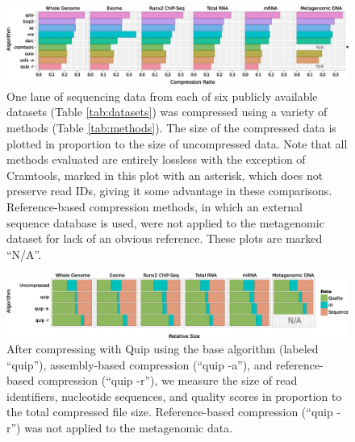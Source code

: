 \documentclass[a4,center,fleqn]{NAR}
\begin{document}
\begin{figure}
\begin{center}
\includegraphics[width=\textwidth]{sizes.eps}
\end{center}
\caption{
One lane of sequencing data from each of six publicly available datasets
(Table \ref{tab:datasets}) was compressed using a variety of methods (Table
\ref{tab:methods}). The size of the compressed data is plotted in proportion
to the size of uncompressed data. Note that all methods evaluated are entirely
lossless with the exception of Cramtools, marked in this plot with an
asterisk, which does not preserve read IDs, giving it some advantage in these
comparisons. Reference-based compression methods, in which an external
sequence database is used, were not applied to the metagenomic dataset for lack of an
obvious reference. These
plots are marked ``N/A''.
}
\label{fig:sizes}
\end{figure}



\begin{figure}
\centerline{\includegraphics[width=\textwidth]{relative_sizes.eps}}
\caption{
After compressing with Quip using the base algorithm (labeled ``quip''),
assembly-based compression (``quip -a''), and reference-based compression
(``quip -r''), we measure the size of read identifiers, nucleotide sequences,
and quality scores in proportion to the total compressed file size. Reference-based
compression (``quip -r'') was not applied to the metagenomic data.
}
\label{fig:relative_sizes}
\end{figure}
\end{document}
